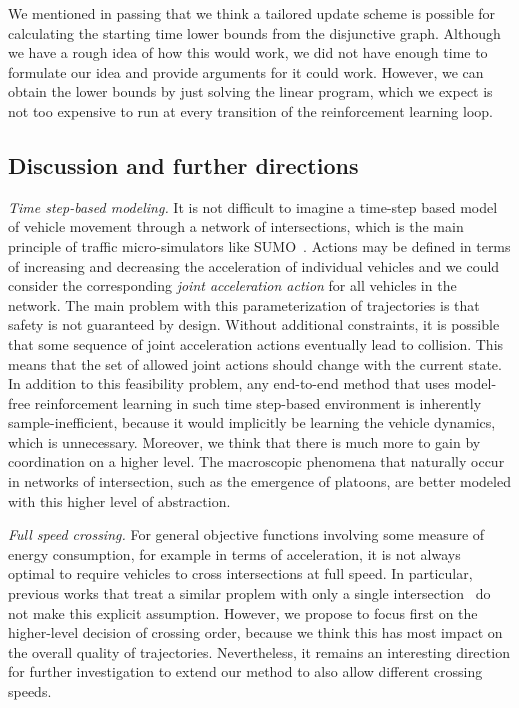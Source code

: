 \documentclass{article}
\theoremstyle{definition}
\theoremstyle{plain}
\begin{document}
We mentioned in passing that we think a tailored update scheme is possible for
calculating the starting time lower bounds from the disjunctive graph. Although
we have a rough idea of how this would work, we did not have enough time to
formulate our idea and provide arguments for it could work. However, we can
obtain the lower bounds by just solving the linear program, which we expect is
not too expensive to run at every transition of the reinforcement learning loop.

\subsection{Discussion and further directions}


\textit{Time step-based modeling.}
%
It is not difficult to imagine a time-step based model of vehicle movement through
a network of intersections, which is the main principle of traffic
micro-simulators like SUMO~\cite{lopezMicroscopicTrafficSimulation2018}. Actions may be defined in terms of increasing
and decreasing the acceleration of individual vehicles and we could consider the
corresponding \textit{joint acceleration action} for all vehicles in the network.
%
The main problem with this parameterization of trajectories is that safety is
not guaranteed by design. Without additional constraints, it is possible that
some sequence of joint acceleration actions eventually lead to collision. This
means that the set of allowed joint actions should change with the current
state.
%
In addition to this feasibility problem, any end-to-end method that uses
model-free reinforcement learning in such time step-based environment is
inherently sample-inefficient, because it would implicitly be learning the
vehicle dynamics, which is unnecessary.
%
Moreover, we think that there is much more to gain by coordination on a higher
level. The macroscopic phenomena that naturally occur in networks of
intersection, such as the emergence of platoons, are better modeled with this
higher level of abstraction.

\vspace{0.5em}\noindent
\textit{Full speed crossing.} For general objective functions involving some
measure of energy consumption, for example in terms of acceleration, it is not
always optimal to require vehicles to cross intersections at full speed. In
particular, previous works that treat a similar proplem with only a single
intersection~\cite{hultApproximateSolutionOptimal2015,zhaoBilevelProgrammingModel2021}
do not make this explicit assumption. However, we propose to focus first on the
higher-level decision of crossing order, because we think this has most impact
on the overall quality of trajectories. Nevertheless, it remains an interesting
direction for further investigation to extend our method to also allow different
crossing speeds.
\end{document}
